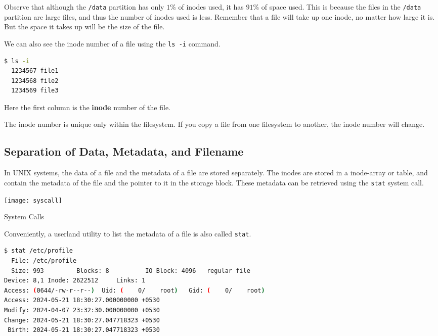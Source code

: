 Observe that although the \lstinline|/data| partition has only $1\%$ of inodes used, it has $91\%$ of space used.
This is because the files in the \lstinline|/data| partition are large files, and thus the number of inodes used is less.
Remember that a file will take up one inode, no matter how large it is.
But the space it takes up will be the size of the file.

We can also see the inode number of a file using the \lstinline|ls -i| command.

\begin{lstlisting}[language=bash]
$ ls -i
  1234567 file1
  1234568 file2
  1234569 file3
\end{lstlisting}

Here the first column is the \textbf{inode} number of the file.

\begin{remark}
  The inode number is unique only within the filesystem.
  If you copy a file from one filesystem to another, the inode number will change.
\end{remark}

\subsection{Separation of Data, Metadata, and Filename}

In UNIX systems, the data of a file and the metadata of a file are stored separately.
The inodes are stored in a inode-array or table, and contain the metadata of the file and the pointer to it in the storage block.
These metadata can be retrieved using the \lstinline|stat| system call.

\begin{marginfigure}
  \texttt{[image: syscall]}
  \caption[System Calls]{System Calls}
\end{marginfigure}

Conveniently, a userland utility to list the metadata of a file is also called \lstinline|stat|.

\begin{lstlisting}[language=bash]
$ stat /etc/profile
  File: /etc/profile
  Size: 993       	Blocks: 8          IO Block: 4096   regular file
Device: 8,1	Inode: 2622512     Links: 1
Access: (0644/-rw-r--r--)  Uid: (    0/    root)   Gid: (    0/    root)
Access: 2024-05-21 18:30:27.000000000 +0530
Modify: 2024-04-07 23:32:30.000000000 +0530
Change: 2024-05-21 18:30:27.047718323 +0530
 Birth: 2024-05-21 18:30:27.047718323 +0530
\end{lstlisting}

